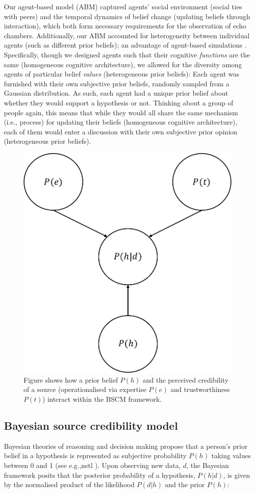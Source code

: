 \documentclass[fleqn,10pt]{wlscirep}
\begin{document}
Our agent-based model (ABM) captured agents' social environment (social ties with peers) and the temporal dynamics of belief change (updating beliefs through interaction), which both form necessary requirements for the observation of echo chambers. Additionally, our ABM accounted for heterogeneity between individual agents (such as different prior beliefs); an advantage of agent-based simulations \cite{wilensky2015introduction}. Specifically, though we designed agents such that their cognitive \textit{functions} are the same (homogeneous cognitive architecture), we allowed for the diversity among agents of particular belief \textit{values} (heterogeneous prior beliefs): Each agent was furnished with their own subjective prior beliefs, randomly sampled from a Gaussian distribution. As such, each agent had a unique prior belief about whether they would support a hypothesis or not. Thinking about a group of people again, this means that while they would all share the same mechanism (i.e., process) for updating their beliefs (homogeneous cognitive architecture), each of them would enter a discussion with their own subjective prior opinion (heterogeneous prior beliefs).

\begin{figure}[ht]
\centering
\includegraphics[width=0.35\columnwidth]{figure1.pdf}
\caption{Figure shows how a prior belief \(P(h)\) and the perceived credibility of a source (operationalised via expertise \(P(e)\) and trustworthiness \(P(t)\)) interact within the BSCM framework.}
\label{fig:bscm}
\end{figure}

\subsection*{Bayesian source credibility model}
Bayesian theories of reasoning and decision making propose that a person's prior belief in a hypothesis is represented as subjective probability \(P(h)\) taking values between 0 and 1 (see e.g.,netl \cite{hahn2007rationality, oaksford2007bayesian}). Upon observing new data, \(d\), the Bayesian framework posits that the posterior probability of a hypothesis, \(P(h|d)\), is given by the normalised product of the likelihood \(P(d|h)\) and the prior \(P(h)\):
\end{document}
